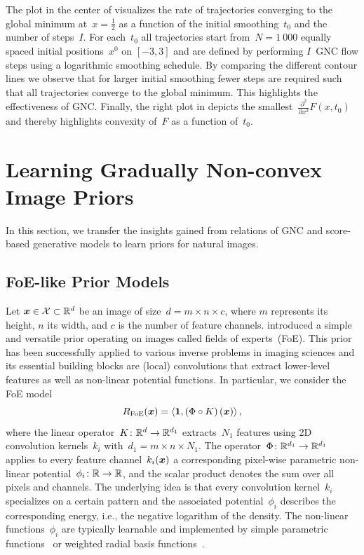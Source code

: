 \documentclass{article}
\newcommand{\X}{\mathcal{X}}
\newcommand{\T}{\mathcal{T}}
\newcommand{\scal}[2]{\left\langle#1,#2\right\rangle}
\renewcommand{\vec}[1]{\mathbf{#1}}
\newcommand{\tmin}{t_\mathrm{min}}
\newcommand{\tmax}{t_\mathrm{max}}
\theoremstyle{plain}
\theoremstyle{definition}
\theoremstyle{remark}
\begin{document}
The plot in the center of  visualizes the rate of trajectories converging to the global minimum at~$x=\tfrac12$ as a function of the initial smoothing~$t_0$ and the number of steps~$I$.
For each~$t_0$ all trajectories start from~$N=1\ 000$ equally spaced initial positions~$x^0$ on $[-3,3]$ and are defined by performing $I$~GNC flow steps using a logarithmic smoothing schedule.
By comparing the different contour lines we observe that for larger initial smoothing fewer steps are required such that all trajectories converge to the global minimum.
This highlights the effectiveness of GNC.
Finally, the right plot in  depicts the smallest~$\frac{\partial^2}{\partial x^2}F(x,t_0)$ and thereby highlights convexity of~$F$ as a function of~$t_0$.

\section{Learning Gradually Non-convex Image Priors}
In this section, we transfer the insights gained from relations of GNC and score-based generative models to learn priors for natural images.


\subsection{FoE-like Prior Models}
Let $\vx\in\X\subset\R^d$ be an image of size~$d=m\times n\times c$, where $m$ represents its height, $n$ its width, and $c$ is the number of feature channels.
\citet{RoBl09} introduced a simple and versatile prior operating on images called fields of experts~(FoE).
This prior has been successfully applied to various inverse problems in imaging sciences and its essential building blocks are (local) convolutions that extract lower-level features as well as non-linear potential functions.
In particular, we consider the FoE model
\[
R_\mathrm{FoE}(\vx) = \scal{\vec{1}}{\left(\Phi \circ K\right)(\vx)},
\]
where the linear operator~$K\colon\mathbb{R}^d\to\mathbb{R}^{d_1}$ extracts~$N_1$ features using 2D convolution kernels~$k_i$ with~$d_1=m\times n\times N_1$.
The operator~$\Phi\colon\mathbb{R}^{d_1}\to\mathbb{R}^{d_1}$ applies to every feature channel~$k_i({\bm{x}})$ a corresponding pixel-wise parametric non-linear potential~$\phi_i\colon\mathbb{R}\to\mathbb{R}$, and the scalar product denotes the sum over all pixels and channels.
The underlying idea is that every convolution kernel~$k_i$ specializes on a certain pattern and the associated potential~$\phi_i$ describes the corresponding energy, i.e., the negative logarithm of the density.
The non-linear functions~$\phi_i$ are typically learnable and implemented by simple parametric functions~\citep{RoBl09,ChRa14} or weighted radial basis functions~\citep{ChPo16,KoKl17}.
\end{document}
